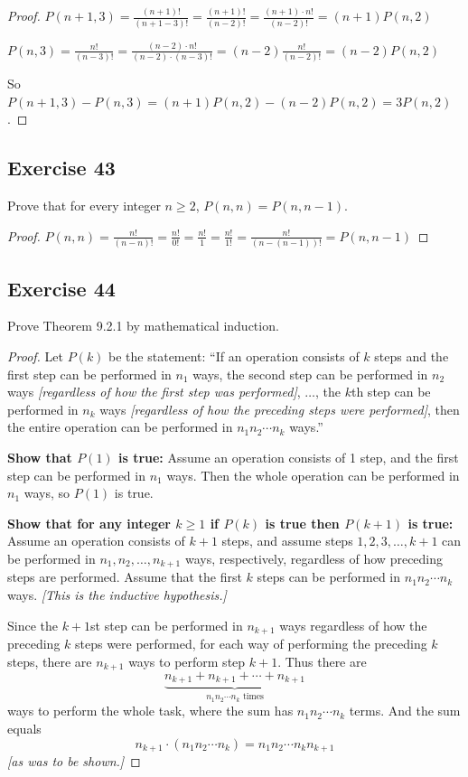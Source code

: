\documentclass[14pt]{extarticle}
\newcommand{\dps}{\displaystyle}
\begin{document}
\begin{proof}
     \(P(n+1,3) = \dps\frac{(n+1)!}{(n+1-3)!} = \frac{(n+1)!}{(n-2)!} = \frac{(n+1) \cdot n!}{(n-2)!} = (n+1)P(n,2)\)

     \(P(n,3) = \dps\frac{n!}{(n-3)!} = \frac{(n-2) \cdot n!}{(n-2) \cdot (n-3)!} = (n-2)\frac{n!}{(n-2)!}=(n-2)P(n,2)\)

     So \(P(n + 1, 3) - P(n, 3) = (n+1)P(n, 2) - (n-2)P(n, 2) = 3P(n,2)\).
\end{proof}

\subsection{Exercise 43}
Prove that for every integer \(n \geq 2\), \(P(n, n) = P(n, n - 1)\).

\begin{proof}
     \(P(n,n)= \dps\frac{n!}{(n-n)!} = \frac{n!}{0!} = \frac{n!}{1} = \frac{n!}{1!} = \frac{n!}{(n-(n-1))!} = P(n,n-1)\)
\end{proof}

\subsection{Exercise 44}
Prove Theorem 9.2.1 by mathematical induction.

\begin{proof}
     Let \(P(k)\) be the statement: ``If an operation consists of $k$ steps and the first step can be performed in $n_1$
     ways, the second step can be performed in $n_2$ ways {\it [regardless of how the first step was performed]},
     \(\ldots\), the $k$th step can be performed in $n_k$ ways {\it [regardless of how the preceding steps were
                    performed]}, then the entire operation can be performed in \(n_1n_2 \cdots n_k\) ways.''

     {\bf Show that \(P(1)\) is true:} Assume an operation consists of 1 step, and the first step can be performed in
     \(n_1\) ways. Then the whole operation can be performed in \(n_1\) ways, so \(P(1)\) is true.

          {\bf Show that for any integer \(k \geq 1\) if \(P(k)\) is true then \(P(k+1)\) is true:} Assume an operation consists
     of $k+1$ steps, and assume steps \(1, 2, 3, \ldots, k+1\) can be performed in \(n_1, n_2, \ldots, n_{k+1}\) ways,
     respectively, regardless of how preceding steps are performed. Assume that the first $k$ steps can be performed
     in \(n_1n_2 \cdots n_k\) ways. {\it [This is the inductive hypothesis.]}

     Since the $k+1$st step can be performed in \(n_{k+1}\) ways regardless of how the preceding $k$ steps were performed,
     for each way of performing the preceding $k$ steps, there are \(n_{k+1}\) ways to perform step $k+1$. Thus there are
     \[
          \underbrace{n_{k+1} + n_{k+1} + \cdots + n_{k+1}}_{n_1n_2 \cdots n_k \text{ times}}
     \]
     ways to perform the whole task, where the sum has \(n_1n_2 \cdots n_k\) terms. And the sum equals
     \[
          n_{k+1} \cdot (n_1n_2 \cdots n_k) = n_1n_2 \cdots n_k n_{k+1}
     \]
     {\it [as was to be shown.]}
\end{proof}
\end{document}
